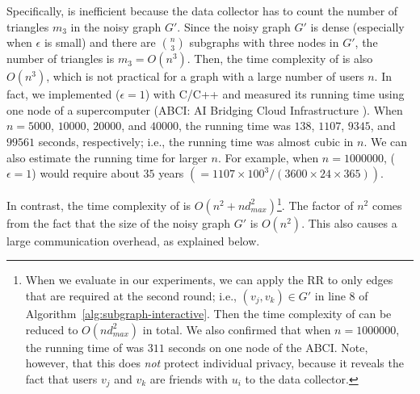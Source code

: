 Specifically,  is inefficient because the data collector has to count the number of triangles $m_3$ in the noisy graph $G'$. 
Since the noisy graph $G'$ is dense (especially when $\epsilon$ is small) and there are $\binom{n}{3}$ subgraphs with three nodes in $G'$, the number of triangles is $m_3 = O(n^3)$. 
Then, the time complexity of  is 
also $O(n^3)$, which is not practical for a graph with a large number of users $n$.
In fact, we implemented  ($\epsilon=1$) with C/C++ and measured its running time using one node of a supercomputer (ABCI: AI Bridging Cloud Infrastructure \cite{ABCI}). 
When $n=5000$, $10000$, $20000$, and $40000$, the running time was $138$, $1107$, $9345$, and $99561$ seconds, respectively; i.e., the running time was almost cubic in $n$. 
We can also estimate the running time for larger $n$. 
For example, when $n=1000000$,  ($\epsilon=1$) would require about $35$ years $(=1107 \times 100^3 /(3600 \times 24 \times 365))$. 

In contrast, the time complexity of  
is 
$O(n^2 + n d_{max}^2)$\footnote{When we 
evaluate 
 in our experiments, 
we can apply the RR to only edges that are required at the second round; i.e., $(v_j,v_k) \in G'$ in line 8 of Algorithm~\ref{alg:subgraph-interactive}. 
Then the time complexity of  
can be reduced to 
$O(n d_{max}^2)$ in total. 
We also confirmed that when $n=1000000$, the running time of  was $311$ seconds on one node of the ABCI. 
Note, however, that this does \textit{not} protect individual privacy, because it reveals the fact that users $v_j$ and $v_k$ are friends with $u_i$ to the data collector.}. 
The factor of $n^2$ comes from the fact that the size of the noisy graph $G'$ is $O(n^2)$. 
This also causes a large communication overhead, as explained below.

